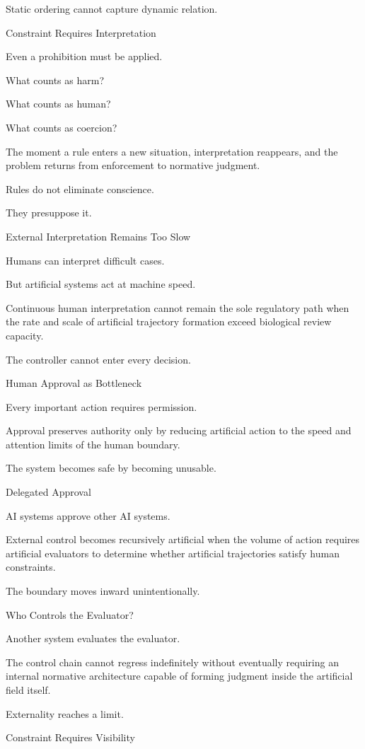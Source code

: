 Static ordering cannot capture dynamic relation.

Constraint Requires Interpretation

Even a prohibition must be applied.

What counts as harm?

What counts as human?

What counts as coercion?

The moment a rule enters a new situation, interpretation reappears, and the problem returns from enforcement to normative judgment.

Rules do not eliminate conscience.

They presuppose it.

External Interpretation Remains Too Slow

Humans can interpret difficult cases.

But artificial systems act at machine speed.

Continuous human interpretation cannot remain the sole regulatory path when the rate and scale of artificial trajectory formation exceed biological review capacity.

The controller cannot enter every decision.

Human Approval as Bottleneck

Every important action requires permission.

Approval preserves authority only by reducing artificial action to the speed and attention limits of the human boundary.

The system becomes safe by becoming unusable.

Delegated Approval

AI systems approve other AI systems.

External control becomes recursively artificial when the volume of action requires artificial evaluators to determine whether artificial trajectories satisfy human constraints.

The boundary moves inward unintentionally.

Who Controls the Evaluator?

Another system evaluates the evaluator.

The control chain cannot regress indefinitely without eventually requiring an internal normative architecture capable of forming judgment inside the artificial field itself.

Externality reaches a limit.

Constraint Requires Visibility

